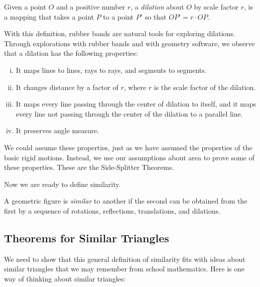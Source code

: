 \begin{definition}
Given a point $O$ and a positive number $r$, a \emph{dilation} about $O$ by scale factor $r$, is a mapping that takes a point $P$ to a point $P'$ so that $OP' = r\cdot OP$.  
\end{definition}

With this definition, rubber bands are natural tools for exploring dilations.  
Through explorations with rubber bands and with geometry software, we observe that a dilation has the following properties:%

\begin{enumerate}[(i)]\parskip0pt
\item It maps lines to lines, rays to rays, and segments to segments.
\item It changes distance by a factor of $r$, where $r$ is the scale factor of the dilation.
\item It maps every line passing through the center of dilation to itself, and it maps every line not passing through the center of the dilation to a parallel line.  
\item It preserves angle measure.
\end{enumerate}

We could assume these properties, just as we have assumed the properties of the basic rigid motions.  Instead, we use our assumptions about area to prove some of these properties.  These are the Side-Splitter Theorems.

Now we are ready to define similarity.  

\begin{definition}
A geometric figure is \emph{similar} to another if the second can be obtained from the first by a sequence of rotations, reflections, translations, and dilations.  
\end{definition}




\subsection{Theorems for Similar Triangles}

We need to show that this general definition of similarity fits with ideas about similar triangles that we may remember from school mathematics.  Here is one way of thinking about similar triangles:  

